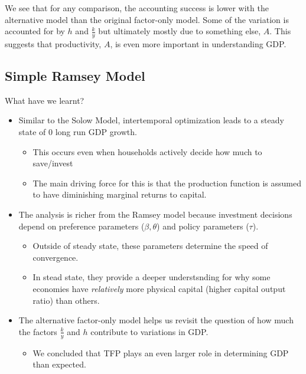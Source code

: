\documentclass[11pt]{article}
\begin{document}
We see that for any comparison, the accounting success is lower with the alternative model than the original factor-only model. Some of the variation is accounted for by $h$ and $\frac{k}{y}$ but ultimately mostly due to something else, $A$. This suggests that productivity, $A$, is even more important in understanding GDP.

\subsection{Simple Ramsey Model}

What have we learnt?
\begin{shaded}
    \begin{itemize}
        \item Similar to the Solow Model, intertemporal optimization leads to a steady state of 0 long run GDP growth.
        \begin{itemize}
            \item This occurs even when households actively decide how much to save/invest
            \item The main driving force for this is that the production function is assumed to have diminishing marginal returns to capital.
        \end{itemize}
        \item The analysis is richer from the Ramsey model because investment decisions depend on preference parameters ($\beta, \theta$) and policy parameters ($\tau$).
        \begin{itemize}
            \item Outside of steady state, these parameters determine the speed of convergence.
            \item In stead state, they provide a deeper understsnding for why some economies have \textit{relatively} more physical capital (higher capital output ratio) than others.
        \end{itemize}
        \item The alternative factor-only model helps us revisit the question of how much the factors $\frac{k}{y}$ and $h$ contribute to variations in GDP. 
        \begin{itemize}
            \item We concluded that TFP plays an even larger role in determining GDP than expected.
        \end{itemize}
    \end{itemize}
\end{shaded}
\end{document}
